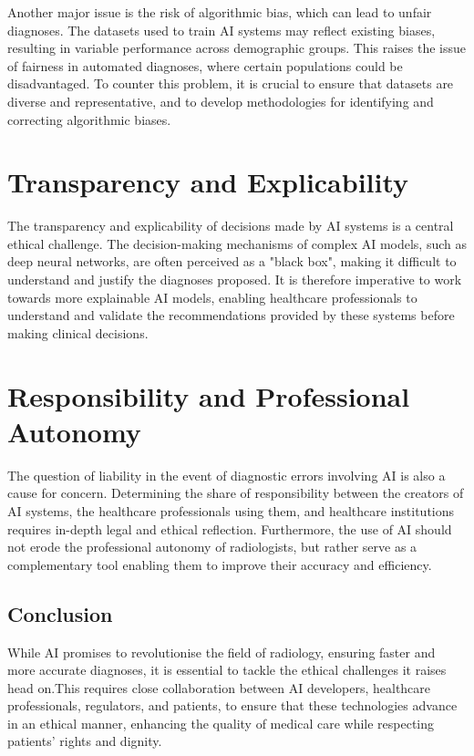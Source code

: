 \documentclass[12pt,oneside]{book} %
\begin{document}
Another major issue is the risk of algorithmic bias, which can lead to unfair
diagnoses. The datasets used to train AI systems may reflect existing biases,
resulting in variable performance across demographic groups. This raises the
issue of fairness in automated diagnoses, where certain populations could be
disadvantaged. To counter this problem, it is crucial to ensure that datasets
are diverse and representative, and to develop methodologies for identifying
and correcting algorithmic biases.

\section{Transparency and Explicability}

The transparency and explicability of decisions made by AI systems is a central
ethical challenge. The decision-making mechanisms of complex AI models, such as
deep neural networks, are often perceived as a "black box", making it difficult
to understand and justify the diagnoses proposed. It is therefore imperative to
work towards more explainable AI models, enabling healthcare professionals to
understand and validate the recommendations provided by these systems before
making clinical decisions.

\section{Responsibility and Professional Autonomy}

The question of liability in the event of diagnostic errors involving AI is
also a cause for concern. Determining the share of responsibility between the
creators of AI systems, the healthcare professionals using them, and healthcare
institutions requires in-depth legal and ethical reflection. Furthermore, the
use of AI should not erode the professional autonomy of radiologists, but
rather serve as a complementary tool enabling them to improve their accuracy
and efficiency.

\subsection{Conclusion}

While AI promises to revolutionise the field of radiology, ensuring faster and
more accurate diagnoses, it is essential to tackle the ethical challenges it
raises head on.This requires close collaboration between AI developers,
healthcare professionals, regulators, and patients, to ensure that these
technologies advance in an ethical manner, enhancing the quality of medical
care while respecting patients' rights and dignity.
\end{document}
